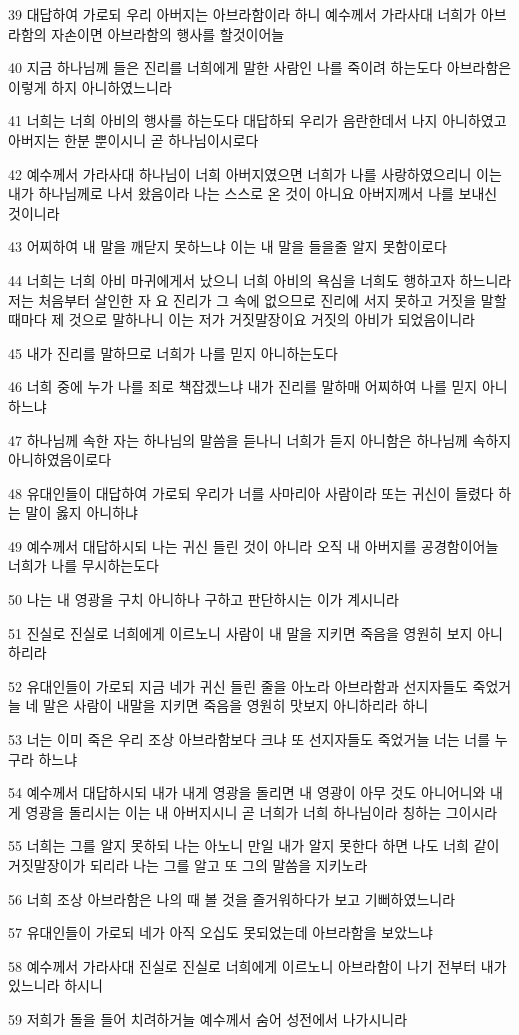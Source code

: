 \par 39 대답하여 가로되 우리 아버지는 아브라함이라 하니 예수께서 가라사대 너희가 아브라함의 자손이면 아브라함의 행사를 할것이어늘
\par 40 지금 하나님께 들은 진리를 너희에게 말한 사람인 나를 죽이려 하는도다 아브라함은 이렇게 하지 아니하였느니라
\par 41 너희는 너희 아비의 행사를 하는도다 대답하되 우리가 음란한데서 나지 아니하였고 아버지는 한분 뿐이시니 곧 하나님이시로다
\par 42 예수께서 가라사대 하나님이 너희 아버지였으면 너희가 나를 사랑하였으리니 이는 내가 하나님께로 나서 왔음이라 나는 스스로 온 것이 아니요 아버지께서 나를 보내신 것이니라
\par 43 어찌하여 내 말을 깨닫지 못하느냐 이는 내 말을 들을줄 알지 못함이로다
\par 44 너희는 너희 아비 마귀에게서 났으니 너희 아비의 욕심을 너희도 행하고자 하느니라 저는 처음부터 살인한 자 요 진리가 그 속에 없으므로 진리에 서지 못하고 거짓을 말할 때마다 제 것으로 말하나니 이는 저가 거짓말장이요 거짓의 아비가 되었음이니라
\par 45 내가 진리를 말하므로 너희가 나를 믿지 아니하는도다
\par 46 너희 중에 누가 나를 죄로 책잡겠느냐 내가 진리를 말하매 어찌하여 나를 믿지 아니하느냐
\par 47 하나님께 속한 자는 하나님의 말씀을 듣나니 너희가 듣지 아니함은 하나님께 속하지 아니하였음이로다
\par 48 유대인들이 대답하여 가로되 우리가 너를 사마리아 사람이라 또는 귀신이 들렸다 하는 말이 옳지 아니하냐
\par 49 예수께서 대답하시되 나는 귀신 들린 것이 아니라 오직 내 아버지를 공경함이어늘 너희가 나를 무시하는도다
\par 50 나는 내 영광을 구치 아니하나 구하고 판단하시는 이가 계시니라
\par 51 진실로 진실로 너희에게 이르노니 사람이 내 말을 지키면 죽음을 영원히 보지 아니하리라
\par 52 유대인들이 가로되 지금 네가 귀신 들린 줄을 아노라 아브라함과 선지자들도 죽었거늘 네 말은 사람이 내말을 지키면 죽음을 영원히 맛보지 아니하리라 하니
\par 53 너는 이미 죽은 우리 조상 아브라함보다 크냐 또 선지자들도 죽었거늘 너는 너를 누구라 하느냐
\par 54 예수께서 대답하시되 내가 내게 영광을 돌리면 내 영광이 아무 것도 아니어니와 내게 영광을 돌리시는 이는 내 아버지시니 곧 너희가 너희 하나님이라 칭하는 그이시라
\par 55 너희는 그를 알지 못하되 나는 아노니 만일 내가 알지 못한다 하면 나도 너희 같이 거짓말장이가 되리라 나는 그를 알고 또 그의 말씀을 지키노라
\par 56 너희 조상 아브라함은 나의 때 볼 것을 즐거워하다가 보고 기뻐하였느니라
\par 57 유대인들이 가로되 네가 아직 오십도 못되었는데 아브라함을 보았느냐
\par 58 예수께서 가라사대 진실로 진실로 너희에게 이르노니 아브라함이 나기 전부터 내가 있느니라 하시니
\par 59 저희가 돌을 들어 치려하거늘 예수께서 숨어 성전에서 나가시니라

